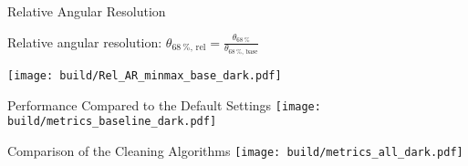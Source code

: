 \begin{frame}[label=rel_AR]{Relative Angular Resolution}
    \begin{flushleft}
        Relative angular resolution: \hspace{2cm} \(\displaystyle \theta_{\SI{68}{\percent},\,\text{rel}} = \frac{\theta_{\SI{68}{\percent}}}{\theta_{\SI{68}{\percent},\,\text{base}}}\)
    \end{flushleft}

    \vspace{0.75cm}
    \centering
    \texttt{[image: build/Rel\_AR\_minmax\_base\_dark.pdf]}
\end{frame}

\begin{frame}[label=metrics_baseline]{Performance Compared to the Default Settings}
    \centering
    \texttt{[image: build/metrics\_baseline\_dark.pdf]}
\end{frame}

\begin{frame}{Comparison of the Cleaning Algorithms}
    \centering
    \texttt{[image: build/metrics\_all\_dark.pdf]}
\end{frame}

